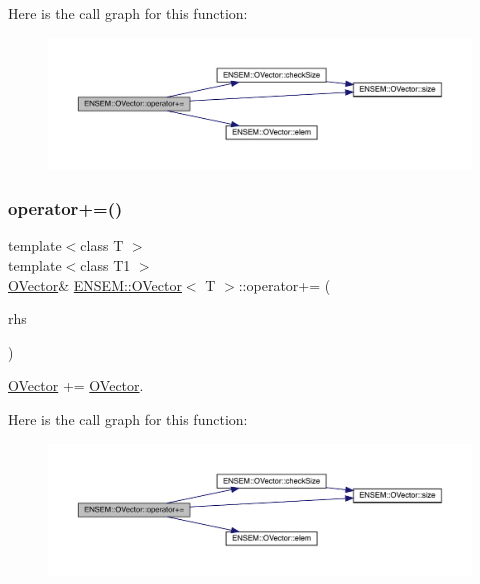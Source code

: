 Here is the call graph for this function\+:
\nopagebreak
\begin{figure}[H]
\begin{center}
\leavevmode
\includegraphics[width=350pt]{d0/d8d/classENSEM_1_1OVector_a5ecd1c4c6a2e7d9a6a3e5189b3a22ba5_cgraph}
\end{center}
\end{figure}
\mbox{\label{classENSEM_1_1OVector_a5ecd1c4c6a2e7d9a6a3e5189b3a22ba5}} 
\subsubsection{\texorpdfstring{operator+=()}{operator+=()}\hspace{0.1cm}{\footnotesize\ttfamily [4/4]}}
{\footnotesize\ttfamily template$<$class T $>$ \\
template$<$class T1 $>$ \\
\mbox{\hyperlink{classENSEM_1_1OVector}{O\+Vector}}\& \mbox{\hyperlink{classENSEM_1_1OVector}{E\+N\+S\+E\+M\+::\+O\+Vector}}$<$ T $>$\+::operator+= (\begin{DoxyParamCaption}\item[{const \mbox{\hyperlink{classENSEM_1_1OVector}{O\+Vector}}$<$ T1 $>$ \&}]{rhs }\end{DoxyParamCaption})\hspace{0.3cm}{\ttfamily [inline]}}



\mbox{\hyperlink{classENSEM_1_1OVector}{O\+Vector}} += \mbox{\hyperlink{classENSEM_1_1OVector}{O\+Vector}}. 

Here is the call graph for this function\+:
\nopagebreak
\begin{figure}[H]
\begin{center}
\leavevmode
\includegraphics[width=350pt]{d0/d8d/classENSEM_1_1OVector_a5ecd1c4c6a2e7d9a6a3e5189b3a22ba5_cgraph}
\end{center}
\end{figure}
\mbox{\label{classENSEM_1_1OVector_ae2ae62360c5eb29827cb7e3d5556859f}} 
